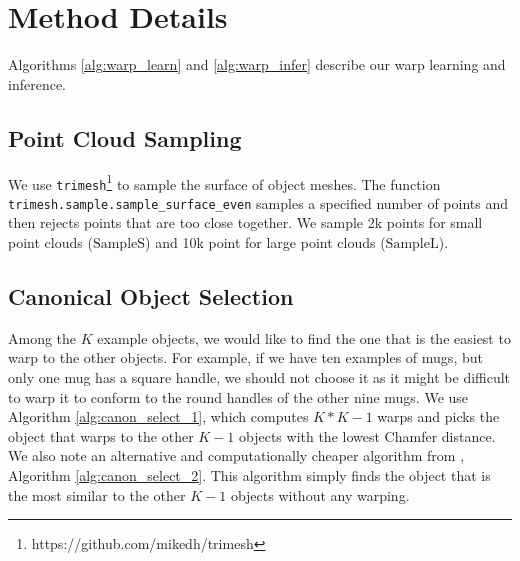 \documentclass{article}
\newcommand{\evdp}[1]{\textcolor{blue}{[\textbf{EvdP:} #1]}}
\begin{document}
\clearpage
\appendix

\section{Method Details}
\label{appendix:method}

Algorithms \ref{alg:warp_learn} and \ref{alg:warp_infer} describe our warp learning and inference.




\subsection{Point Cloud Sampling}
\label{appendix:method:sampling}

We use \texttt{trimesh}\footnote{https://github.com/mikedh/trimesh} to sample the surface of object meshes. The function \texttt{trimesh.sample.sample\_surface\_even} samples a specified number of points and then rejects points that are too close together. We sample 2k points for small point clouds ($\mathrm{SampleS}$) and 10k point for large point clouds ($\mathrm{SampleL}$).

\subsection{Canonical Object Selection}
\label{appendix:method:canonical}

Among the $K$ example objects, we would like to find the one that is the easiest to warp to the other objects. For example, if we have ten examples of mugs, but only one mug has a square handle, we should not choose it as it might be difficult to warp it to conform to the round handles of the other nine mugs. We use Algorithm \ref{alg:canon_select_1}, which computes $K * K-1$ warps and picks the object that warps to the other $K-1$ objects with the lowest Chamfer distance. We also note an alternative and computationally cheaper algorithm from \citet{thompson21shapebased}, Algorithm \ref{alg:canon_select_2}. This algorithm simply finds the object that is the most similar to the other $K-1$ objects without any warping.




\end{document}

